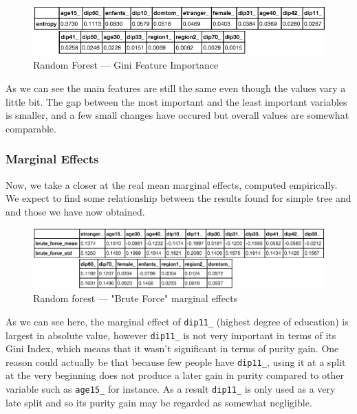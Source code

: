 \begin{figure}
    \centering
    \includegraphics[scale=0.35]{img/random_forest_gini.png}
    \caption{Random Forest --- Gini Feature Importance}
    \label{fig:random_forest_gini}
\end{figure}

As we can see the main features are still the same even though the values vary a little bit. The gap between the most important and the least important variables is smaller, and a few small changes have occured but overall values are somewhat comparable.

\subsubsection{Marginal Effects}

Now, we take a closer at the real mean marginal effects, computed empirically. We expect to find some relationship between the results found for simple tree and and those we have now obtained.

\begin{figure}
    \centering
    \includegraphics[scale=0.25]{img/random_forest_brute_force.png}
    \caption{Random forest --- "Brute Force" marginal effects}
    \label{fig:random_forest_brute_force}
\end{figure}

As we can see here, the marginal effect of \texttt{dip11\_} (highest degree of education) is largest in absolute value, however \texttt{dip11\_} is not very important in terms of its Gini Index, which means that it wasn't significant in terms of purity gain. One reason could actually be that because few people have \texttt{dip11\_}, using it at a split at the very beginning does not produce a later gain in purity compared to other variable such as \texttt{age15\_} for instance. As a result \texttt{dip11\_} is only used as a very late split and so its purity gain may be regarded as somewhat negligible.

